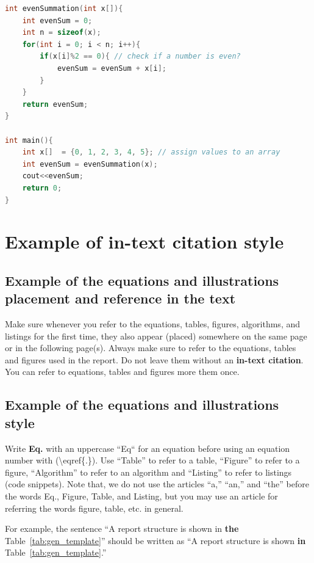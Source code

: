 \begin{lstlisting}[language=C, caption={Code snippet in \LaTeX ~and  this is a C/C++ code example}, label=list:cpp_code_ex]
int evenSummation(int x[]){
    int evenSum = 0;
    int n = sizeof(x);
    for(int i = 0; i < n; i++){
        if(x[i]%2 == 0){ // check if a number is even?
            evenSum = evenSum + x[i];
    	}
    }
    return evenSum;     
}

int main(){
    int x[]  = {0, 1, 2, 3, 4, 5}; // assign values to an array
    int evenSum = evenSummation(x);
    cout<<evenSum;
    return 0;
}
\end{lstlisting}



\section{Example of in-text citation style}
\subsection{Example of the equations and illustrations placement and reference in the text}
Make sure whenever you refer to the equations, tables, figures, algorithms,  and listings for the first time, they also appear (placed) somewhere on the same page or in the following page(s). Always make sure to refer to the equations, tables and figures used in the report. Do not leave them without an \textbf{in-text citation}. You can refer to equations, tables and figures more them once.

\subsection{Example of the equations and illustrations style}
Write \textbf{Eq.} with an uppercase ``Eq`` for an equation before using an equation number with (\textbackslash eqref\{.\}). Use ``Table'' to refer to a table, ``Figure'' to refer to a figure, ``Algorithm'' to refer to an algorithm and ``Listing'' to refer to listings (code snippets). Note that, we do not use the articles ``a,'' ``an,'' and ``the'' before the words Eq., Figure, Table, and Listing, but you may use an article for referring the words figure, table, etc. in general.

For example, the sentence ``A report structure is shown in \textbf{the} Table~\ref{tab:gen_template}'' should be written as ``A report structure is shown \textbf{in} Table~\ref{tab:gen_template}.'' 

